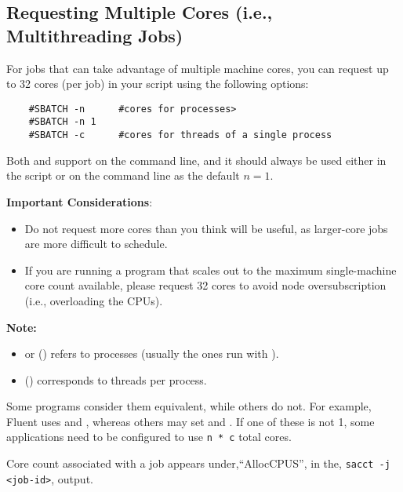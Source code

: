 \subsection{Requesting Multiple Cores (i.e., Multithreading Jobs)}
\label{sect:multicore-jobs}

For jobs that can take advantage of multiple machine cores, you can
request up to 32 cores (per job) in your script using the following options:

\begin{verbatim}
	#SBATCH -n      #cores for processes>
	#SBATCH -n 1
	#SBATCH -c      #cores for threads of a single process
\end{verbatim}

\noindent Both  and  support  on the command line,
and it should always be used either in the script or on the command line as the
default $n=1$.

\textbf{Important Considerations}:
\begin{itemize}
	\item Do not request more cores than you think will be useful,
	as larger-core jobs are more difficult to schedule.

	\item If you are running a program that scales out to the maximum single-machine core count available,
    please request 32 cores to avoid node oversubscription (i.e., overloading the CPUs).
\end{itemize}

\textbf{Note:}
\begin{itemize}
    \item{} or 
    () refers to processes (usually the ones run with ).
    \item {} () corresponds to threads per process.
\end{itemize}

\noindent Some programs consider them equivalent, while others do not.
For example, Fluent uses  and ,
whereas others may set  and .
If one of these is not 1, some applications need to be configured to use \texttt{n * c} total cores.

\noindent Core count associated with a job appears under,``AllocCPUS'', in the, \texttt{sacct -j <job-id>}, output.

